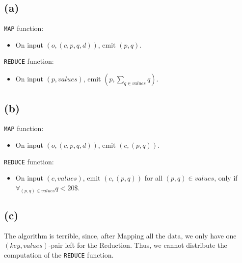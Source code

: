 \documentclass[12pt]{article}
\begin{document}
\subsection*{(a)}
\verb|MAP| function:
\begin{itemize}
	\item	On input $(o, (c,p,q,d))$, emit $(p,q)$.
\end{itemize}
\verb|REDUCE| function:
\begin{itemize}
	\item	On input $(p, values)$, emit $(p,\sum_{q \in values} q)$.
\end{itemize}

\subsection*{(b)}
\verb|MAP| function:
\begin{itemize}
	\item	On input $(o, (c,p,q,d))$, emit $(c,(p,q))$.
\end{itemize}
\verb|REDUCE| function:
\begin{itemize}
	\item	On input $(c, values)$, emit $(c,(p,q))$ for all $(p,q) \in values$, only if $\forall_{(p,q) \in values} q < 20\$$.
\end{itemize}

\subsection*{(c)}
The algorithm is terrible, since, after Mapping all the data, we only have one $(key, values)$-pair left for the Reduction. Thus, we cannot distribute the computation of the \verb|REDUCE| function.
\end{document}

